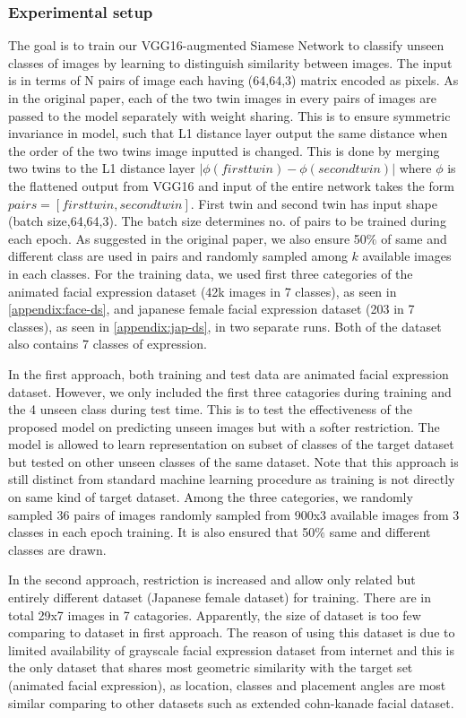 \documentclass{article}
\begin{document}
\subsubsection{\textbf{Experimental setup}}

The goal is to train our VGG16-augmented Siamese Network to classify unseen classes of images by learning to distinguish similarity between images. The input is in terms of N pairs of image each having (64,64,3) matrix encoded as pixels. As in the original paper, each of the two twin images in every pairs of images are passed to the model separately with weight sharing. This is to ensure symmetric invariance in model, such that L1 distance layer output the same distance when the order of the two twins image inputted is changed. This is done by merging two twins to the L1 distance layer $|\phi(first twin) - \phi(second twin)|$ where $\phi$ is the flattened output from VGG16 and input of the entire network takes the form $pairs = [first twin,second twin]$. First twin and second twin has input shape (batch size,64,64,3). The batch size determines no. of pairs to be trained during each epoch. As suggested in the original paper, we also ensure 50$\%$ of same and different class are used in pairs and randomly sampled among $k$ available images in each classes. For the training data, we used first three categories of the animated facial expression dataset (42k images in 7 classes), as seen in \ref{appendix:face-ds}, and japanese female facial expression dataset (203 in 7 classes), as seen in \ref{appendix:jap-ds}, in two separate runs. Both of the dataset also contains 7 classes of expression.

In the first approach, both training and test data are animated facial expression dataset. However, we only included the first three catagories during training and the 4 unseen class during test time. This is to test the effectiveness of the proposed model on predicting unseen images but with a softer restriction. The model is allowed to learn representation on subset of classes of the target dataset but tested on other unseen classes of the same dataset. Note that this approach is still distinct from standard machine learning procedure as training is not directly on same kind of target dataset. Among the three categories, we randomly sampled 36 pairs of images randomly sampled from 900x3 available images from 3 classes in each epoch training. It is also ensured that 50$\%$ same and different classes are drawn.

In the second approach, restriction is increased and allow only related but entirely different dataset (Japanese female dataset) for training. There are in total 29x7 images in 7 catagories. Apparently, the size of dataset is too few comparing to dataset in first approach. The reason of using this dataset is due to limited availability of grayscale facial expression dataset from internet and this is the only dataset that shares most geometric similarity with the target set (animated facial expression), as location, classes and placement angles are most similar comparing to other datasets such as extended cohn-kanade facial dataset.
\end{document}
